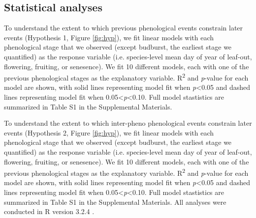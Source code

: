 \documentclass{article}
\begin{document}
\subsection*{Statistical analyses}
To understand the extent to which previous phenological events constrain later events (Hypothesis 1, Figure \ref{fig:hyp}), we fit linear models with each phenological stage that we observed (except budburst, the earliest stage we quantified) as the response variable (i.e. species-level mean day of year of leaf-out, flowering, fruiting, or senesence).  We fit 10 different models, each with one of the previous phenological stages as the explanatory variable. R\textsuperscript{2} and \textit{p}-value for each model are shown, with solid lines representing model fit when \textit{p}<0.05 and dashed lines representing model fit when 0.05<\textit{p}<0.10. Full model stastistics are summarized in Table S1 in the Supplemental Materials.
\par To understand the extent to which inter-pheno phenological events constrain later events (Hypothesis 2, Figure \ref{fig:hyp}), we fit linear models with each phenological stage that we observed (except budburst, the earliest stage we quantified) as the response variable (i.e. species-level mean day of year of leaf-out, flowering, fruiting, or senesence).  We fit 10 different models, each with one of the previous phenological stages as the explanatory variable. R\textsuperscript{2} and \textit{p}-value for each model are shown, with solid lines representing model fit when \textit{p}<0.05 and dashed lines representing model fit when 0.05<\textit{p}<0.10. Full model stastistics are summarized in Table S1 in the Supplemental Materials.
All analyses were conducted in R version 3.2.4 \citep{rcoreteam2016}.
\end{document}
